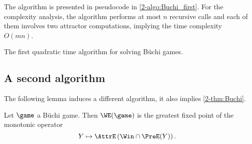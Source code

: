 The algorithm is presented in pseudocode in \cref{2-algo:Buchi_first}.
For the complexity analysis, the algorithm performs at most $n$ recursive calls
and each of them involves two attractor computations, implying the time complexity $O(mn)$.

\begin{algorithm}
 \DontPrintSemicolon

\caption{The first quadratic time algorithm for solving B{\"uchi} games.}
\label{2-algo:Buchi_first}
\end{algorithm}

\subsection*{A second algorithm}
The following lemma induces a different algorithm, it also implies \cref{2-thm:Buchi}.

\begin{lemma}
\label{2-lem:Buchi}
Let $\game$ a B{\"u}chi game.
Then $\WE(\game)$ is the greatest fixed point of the monotonic operator 
\[
Y \mapsto \AttrE \left( \Win \cap \PreE(Y) \right).
\]
\end{lemma}

